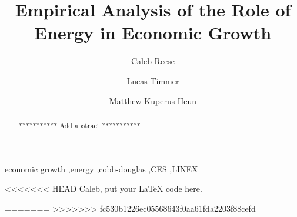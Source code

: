 \documentclass[preprint,authoryear,12pt]{elsarticle}\usepackage{graphicx, color}
\begin{document}
\begin{frontmatter}



\title{Empirical Analysis of the Role of Energy in Economic Growth}


\author[Calvin]{Caleb Reese}
\author[Calvin]{Lucas Timmer}
\author[Calvin]{Matthew Kuperus Heun }

\address[Calvin]{Engineering Department, Calvin College, Grand Rapids, MI 49546, USA}

\begin{abstract}
*********** Add abstract ***********
\end{abstract}

\begin{keyword}
economic growth \sep energy \sep cobb-douglas \sep CES \sep LINEX
\end{keyword}

\end{frontmatter}


<<<<<<< HEAD
Caleb, put your LaTeX code here.

=======
>>>>>>> fc530b1226ec05568643f0aa61fda2203f88cefd
\end{document}
